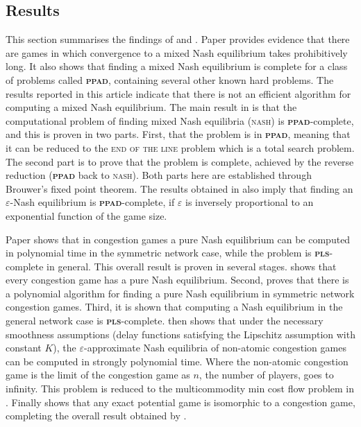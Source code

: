 \documentclass{article}
\begin{document}
\begin{multicols}{2}
\section{Results}
This section summarises the findings of \cite{Daskalakis.2009} and \cite{Fabrikant.2004}. 
Paper \cite{Daskalakis.2009} provides evidence that there are games in which convergence to a mixed Nash equilibrium takes prohibitively long. It also shows that finding a mixed Nash equilibrium is complete for a class of problems called \textbf{\textsc{ppad}}, containing several other known hard problems. The results reported in this article indicate that there is not an efficient algorithm for computing a mixed Nash equilibrium. The main result in \cite{Daskalakis.2009} is that the computational problem of finding mixed Nash equilibria (\textsc{nash}) is \textbf{\textsc{ppad}}-complete, and this is proven in two parts. First, that the problem is in \textbf{\textsc{ppad}}, meaning that it can be reduced to the \textsc{end of the line} problem which is a total search problem. The second part is to prove that the problem is complete, achieved by the reverse reduction (\textbf{\textsc{ppad}} back to \textsc{nash}). Both parts here are established through Brouwer's fixed point theorem. The results obtained in \cite{Daskalakis.2009} also imply that finding an $\varepsilon$-Nash equilibrium is \textbf{\textsc{ppad}}-complete, if $\varepsilon$ is inversely proportional to an exponential function of the game size. 

Paper \cite{Fabrikant.2004} shows that in congestion games a pure Nash equilibrium can be computed in polynomial time in the symmetric network case, while the problem is \textbf{\textsc{pls}}-complete in general. This overall result is proven in several stages. \cite{rosenthal1973class} shows that every congestion game has a pure Nash equilibrium. Second, \cite{Fabrikant.2004} proves that there is a polynomial algorithm for finding a pure Nash equilibrium in symmetric network congestion games. Third, it is shown that computing a Nash equilibrium in the general network case is \textbf{\textsc{pls}}-complete. \cite{Fabrikant.2004} then shows that under the necessary smoothness assumptions (delay functions satisfying the Lipschitz assumption with constant $K$), the $\varepsilon$-approximate Nash equilibria of non-atomic congestion games can be computed in strongly polynomial time. Where the non-atomic congestion game is the limit of the congestion game as $n$, the number of players, goes to infinity. This problem is reduced to the multicommodity min cost flow problem in \cite{Fabrikant.2004}. Finally \cite{monderer1996potential} shows that any exact potential game is isomorphic to a congestion game, completing the overall result obtained by \cite{Fabrikant.2004}. 



\end{multicols}
\end{document}
